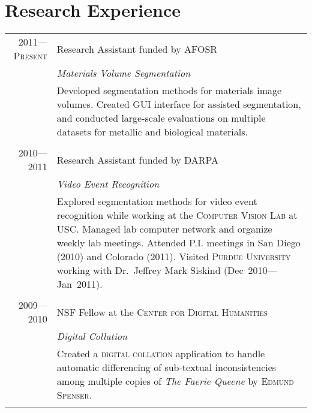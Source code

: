 \documentclass[a4paper,10pt]{article}
\begin{document}
\section{Research Experience}
\begin{tabular}{r|p{11cm}}
\textsc{2011---Present}
& Research Assistant funded by \textsc{AFOSR} \\
&\emph{Materials Volume Segmentation}\\
&\footnotesize{Developed segmentation methods for materials image volumes.  Created GUI interface for assisted segmentation, and conducted large-scale evaluations on multiple datasets for metallic and biological materials.}
\\\multicolumn{2}{c}{} \\
\textsc{2010---2011}
& Research Assistant funded by \textsc{DARPA} \\
&\emph{Video Event Recognition}\\
&\footnotesize{Explored segmentation methods for video event recognition while working at the \textsc{Computer Vision Lab} at \textsc{USC}. Managed lab computer network and organize weekly lab meetings.  Attended P.I. meetings in San Diego (2010) and Colorado (2011). Visited \textsc{Purdue University} working with Dr.~Jeffrey Mark Siskind (Dec~2010---Jan~2011).}
\\\multicolumn{2}{c}{} \\
\textsc{2009---2010}
& NSF Fellow at the \textsc{Center for Digital Humanities} \\
&\emph{Digital Collation}\\
&\footnotesize{Created a \textsc{digital collation} application to handle automatic differencing of sub-textual inconsistencies among multiple copies of \emph{The Faerie Queene} by \textsc{Edmund Spenser}.}
\\\multicolumn{2}{c}{} \\
\end{tabular}

\pagebreak
\end{document}
